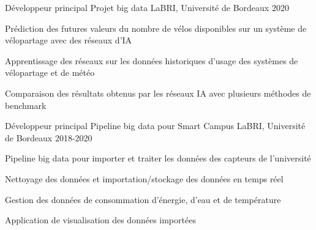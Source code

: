
\begin{cventries}
	\cventry
	{Développeur principal}
	{Projet big data}
	{LaBRI, Université de Bordeaux}
	{2020}
	{
		\begin{cvitems}
			\item {Prédiction des futures valeurs du nombre de vélos disponibles sur un système de vélopartage avec des réseaux d'IA}
			\item {Apprentissage des réseaux sur les données historiques d'usage des systèmes de vélopartage et de météo}
			\item {Comparaison des résultats obtenus par les réseaux IA avec plusieurs méthodes de benchmark}
		\end{cvitems}
	}
	
	\cventry
	{Développeur principal}
	{Pipeline big data pour Smart Campus}
	{LaBRI, Université de Bordeaux}
	{2018-2020}
	{
		\begin{cvitems}
			\item {Pipeline big data pour importer et traiter les données des capteurs de l'université}
			\item {Nettoyage des données et importation/stockage des données en temps réel}
			\item {Gestion des données de consommation d'énergie, d'eau et de température}
			\item {Application de visualisation des données importées}
		\end{cvitems}
	}
\end{cventries}
